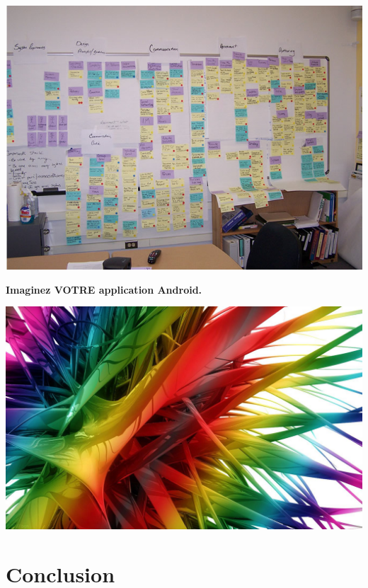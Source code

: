 \documentclass{beamer}
\begin{document}
\begin{frame}
\begin{center}
\includegraphics[scale=0.35]{afinity_diag.jpg}
\end{center}
\end{frame}

\begin{frame}
\begin{center}
\textbf{Imaginez VOTRE application Android.}
\end{center}

\begin{center}
\includegraphics[scale=0.2]{couleurs.jpg}

\end{center}
\end{frame}

\section*{Conclusion}
\end{document}
